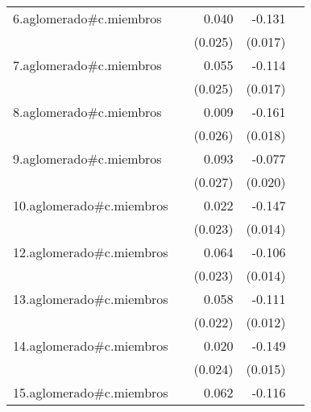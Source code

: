 {\begin{longtable}{l*{4}{D{.}{.}{-1}}}
\addlinespace
6.aglomerado#c.miembros&                     &       0.040         &      -0.131\sym{***}&                     \\
            &                     &     (0.025)         &     (0.017)         &                     \\
\addlinespace
7.aglomerado#c.miembros&                     &       0.055\sym{*}  &      -0.114\sym{***}&                     \\
            &                     &     (0.025)         &     (0.017)         &                     \\
\addlinespace
8.aglomerado#c.miembros&                     &       0.009         &      -0.161\sym{***}&                     \\
            &                     &     (0.026)         &     (0.018)         &                     \\
\addlinespace
9.aglomerado#c.miembros&                     &       0.093\sym{***}&      -0.077\sym{***}&                     \\
            &                     &     (0.027)         &     (0.020)         &                     \\
\addlinespace
10.aglomerado#c.miembros&                     &       0.022         &      -0.147\sym{***}&                     \\
            &                     &     (0.023)         &     (0.014)         &                     \\
\addlinespace
12.aglomerado#c.miembros&                     &       0.064\sym{**} &      -0.106\sym{***}&                     \\
            &                     &     (0.023)         &     (0.014)         &                     \\
\addlinespace
13.aglomerado#c.miembros&                     &       0.058\sym{**} &      -0.111\sym{***}&                     \\
            &                     &     (0.022)         &     (0.012)         &                     \\
\addlinespace
14.aglomerado#c.miembros&                     &       0.020         &      -0.149\sym{***}&                     \\
            &                     &     (0.024)         &     (0.015)         &                     \\
\addlinespace
15.aglomerado#c.miembros&                     &       0.062\sym{*}  &      -0.116\sym{***}&                     \\

\end{longtable}}
